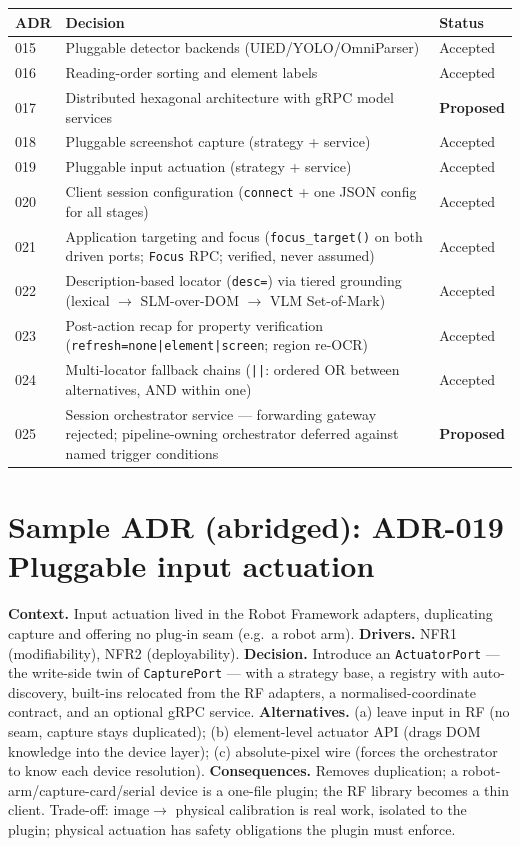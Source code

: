 \documentclass[11pt,a4paper]{report}
\newcommand{\code}[1]{\texttt{#1}}
\begin{document}
\begin{longtable}{@{}p{1.4cm}p{7.8cm}p{2.4cm}@{}}
\toprule
\textbf{ADR} & \textbf{Decision} & \textbf{Status} \\
\midrule
\endhead
015 & Pluggable detector backends (UIED/YOLO/OmniParser) & Accepted \\
016 & Reading-order sorting and element labels & Accepted \\
017 & Distributed hexagonal architecture with gRPC model services & \textbf{Proposed} \\
018 & Pluggable screenshot capture (strategy + service) & Accepted \\
019 & Pluggable input actuation (strategy + service) & Accepted \\
020 & Client session configuration (\code{connect} + one JSON config for all stages) & Accepted \\
021 & Application targeting and focus (\code{focus\_target()} on both driven ports; \code{Focus} RPC; verified, never assumed) & Accepted \\
022 & Description-based locator (\code{desc=}) via tiered grounding (lexical $\rightarrow$ SLM-over-DOM $\rightarrow$ VLM Set-of-Mark) & Accepted \\
023 & Post-action recap for property verification (\code{refresh=none|element|screen}; region re-OCR) & Accepted \\
024 & Multi-locator fallback chains (\code{||}: ordered OR between alternatives, AND within one) & Accepted \\
025 & Session orchestrator service --- forwarding gateway rejected; pipeline-owning orchestrator deferred against named trigger conditions & \textbf{Proposed} \\
\bottomrule
\end{longtable}

\section{Sample ADR (abridged): ADR-019 Pluggable input actuation}
\textbf{Context.} Input actuation lived in the Robot Framework adapters, duplicating
capture and offering no plug-in seam (e.g.\ a robot arm). \textbf{Drivers.} NFR1
(modifiability), NFR2 (deployability). \textbf{Decision.} Introduce an
\code{ActuatorPort} --- the write-side twin of \code{CapturePort} --- with a
strategy base, a registry with auto-discovery, built-ins relocated from the RF
adapters, a normalised-coordinate contract, and an optional gRPC service.
\textbf{Alternatives.} (a) leave input in RF (no seam, capture stays duplicated);
(b) element-level actuator API (drags DOM knowledge into the device layer);
(c) absolute-pixel wire (forces the orchestrator to know each device resolution).
\textbf{Consequences.} Removes duplication; a robot-arm/capture-card/serial device
is a one-file plugin; the RF library becomes a thin client. Trade-off: image$\to$
physical calibration is real work, isolated to the plugin; physical actuation has
safety obligations the plugin must enforce.
\end{document}
